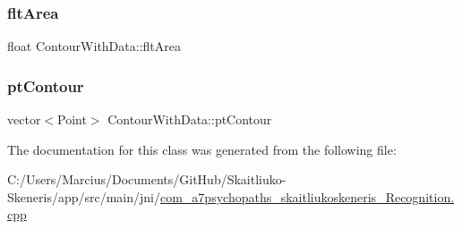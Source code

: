 \mbox{\label{class_contour_with_data_a640536a3a32dd02f85e6a5f70ddfe7e3}} 
\subsubsection{\texorpdfstring{flt\+Area}{fltArea}}
{\footnotesize\ttfamily float Contour\+With\+Data\+::flt\+Area}

\mbox{\label{class_contour_with_data_aeb3c5c0143088358af99fd02f02e9e59}} 
\subsubsection{\texorpdfstring{pt\+Contour}{ptContour}}
{\footnotesize\ttfamily vector$<$Point$>$ Contour\+With\+Data\+::pt\+Contour}



The documentation for this class was generated from the following file\+:\begin{DoxyCompactItemize}
\item 
C\+:/\+Users/\+Marcius/\+Documents/\+Git\+Hub/\+Skaitliuko-\/\+Skeneris/app/src/main/jni/\mbox{\hyperlink{com__a7psychopaths__skaitliukoskeneris___recognition_8cpp}{com\+\_\+a7psychopaths\+\_\+skaitliukoskeneris\+\_\+\+Recognition.\+cpp}}\end{DoxyCompactItemize}
